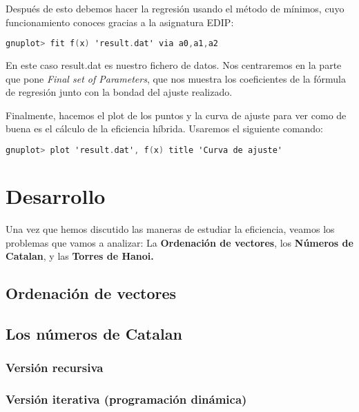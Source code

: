 \documentclass[a4paper,12pt]{article} %
\begin{document}
    Después de esto debemos hacer la regresión usando el método de mínimos, cuyo funcionamiento conoces gracias a la asignatura EDIP:

    \begin{lstlisting}[language=C, caption={Uso de gnuplot para l regresión}]
        gnuplot> fit f(x) 'result.dat' via a0,a1,a2
         \end{lstlisting}

    En este caso result.dat es nuestro fichero de datos.
    Nos centraremos en la parte que pone \textit{Final set of Parameters}, que nos muestra los coeficientes de la fórmula de regresión 
    junto con la bondad del ajuste realizado.
    
    Finalmente, hacemos el plot de los puntos y la curva de ajuste para ver como de buena es el cálculo de la eficiencia híbrida. Usaremos el 
    siguiente comando:

    \begin{lstlisting}[language=C, caption={Representación de la regresión}]
        gnuplot> plot 'result.dat', f(x) title 'Curva de ajuste'
         \end{lstlisting}

        


\section{Desarrollo}
Una vez que hemos discutido las maneras de estudiar la eficiencia, veamos los problemas
que vamos a analizar: La \textbf{Ordenación de vectores}, 
los \textbf{Números de Catalan}, y las \textbf{Torres de Hanoi.}

\subsection{Ordenación de vectores}



\subsection{Los números de Catalan}

\subsubsection{Versión recursiva}

\subsubsection{Versión iterativa (programación dinámica)}
\end{document}
